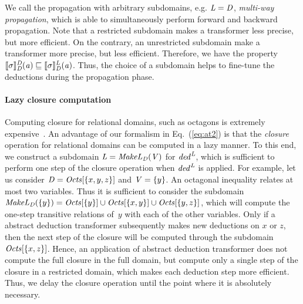 We call the propagation with arbitrary subdomains,
e.g. $\mathit{L}=\mathit{D}$, \emph{multi-way propagation}, which is able
to simultaneously perform forward and backward propagation.
%
Note that a restricted subdomain makes a transformer less precise, but more
efficient.  On the contrary, an unrestricted subdomain make a transformer more 
precise, but less efficient. Therefore, we have the property
$\llbracket \sigma\rrbracket_{\mathit{D}}^{\mathit{D}}(\mathit{a})\sqsubseteq
\llbracket \sigma\rrbracket_{\mathit{D}}^{\mathit{L}}(\mathit{a})$.
Thus, the choice of a subdomain helps to fine-tune the deductions 
during the propagation phase.

\paragraph {\textbf{Lazy closure computation}} 
Computing closure for relational domains, such as octagons is extremely
expensive~\cite{pldi15}.  An advantage of our formalism in 
Eq.~(\ref{eq:at2}) is that
the \emph{closure} operation for relational domains can be computed 
in a lazy manner. To this end, we construct a subdomain 
$\mathit{L}=\mathit{MakeL}_{\mathit{D}}(\mathit{V})$ for $\mathit{ded}^{\mathit{L}}$,
which is sufficient to perform one step of the closure operation when 
$\mathit{ded}^{\mathit{L}}$ is applied.
%
For example, let us consider $\mathit{D}=\mathit{Octs}[\{x,y,z\}]$ and
$\mathit{V}=\{y\}$. An octagonal inequality relates at 
most two variables. Thus it is sufficient to consider the subdomain
$\mathit{MakeL}_{\mathit{D}}(\{y\})=\mathit{Octs}[\{y\}]\cup\mathit{Octs}[\{x,y\}]\cup\mathit{Octs}[\{y,z\}]$,
which will compute the one-step transitive relations of~$y$ with each
of the other variables. 
%
Only if a abstract deduction transformer subsequently makes new deductions 
on $x$ or $z$, then the next step of the closure will be computed through 
the subdomain $\mathit{Octs}[\{x,z\}]$.
Hence, an application of abstract deduction transformer does not 
compute the full closure in the full domain, but compute only a 
single step of the closure in a restricted domain, which makes each 
deduction step more efficient.  Thus, we delay the closure operation 
until the point where it is absolutely necessary. 
%
%
 
